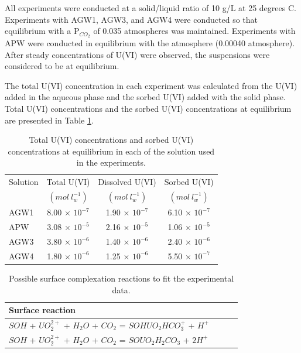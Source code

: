 All experiments were conducted at a solid/liquid ratio of 10 g/L at 
25 degrees C. Experiments with AGW1, AGW3, and AGW4 were conducted 
so that equilibrium with a P$_{CO_2}$ of 0.035 atmospheres was maintained.  
Experiments with APW were conducted in equilibrium with the 
atmosphere (0.00040 atmosphere).  
After steady concentrations of U(VI) were observed, 
the suspensions were considered to be at equilibrium.

The total U(VI) concentration in each experiment was calculated from the U(VI) 
added in the aqueous phase and the sorbed U(VI) added with the solid phase.  
Total U(VI) concentrations and the sorbed U(VI) concentrations 
at equilibrium are presented in Table \ref{ex_u_scm2}.

\begin{table}[h]
\caption{Total U(VI) concentrations and sorbed U(VI) concentrations 
at equilibrium in each of the solution used in the experiments.}
\begin{center}
\begin{tabular}{l c c c}
\hline
 Solution                & Total U(VI)              & Dissolved U(VI)         & Sorbed U(VI)        \\
                         & $(mol\ l^{-1}_w)$        & $(mol\ l^{-1}_w)$       & $(mol\ l^{-1}_w)$   \\ \hline
 AGW1                    & 8.00 $\times$ $10^{-7}$  & 1.90 $\times$ $10^{-7}$ & 6.10 $\times$ $10^{-7}$ \\
 APW                     & 3.08 $\times$ $10^{-5}$  & 2.16 $\times$ $10^{-5}$ & 1.06 $\times$ $10^{-5}$ \\ 
 AGW3                    & 3.80 $\times$ $10^{-6}$  & 1.40 $\times$ $10^{-6}$ & 2.40 $\times$ $10^{-6}$ \\
 AGW4                    & 1.80 $\times$ $10^{-6}$  & 1.25 $\times$ $10^{-6}$ & 5.50 $\times$ $10^{-7}$ \\ \hline
\end{tabular}
\label{ex_u_scm2}
\end{center}
\end{table}

\begin{table}[h]
\caption{Possible surface complexation reactions to fit the experimental data.}
\begin{center}
\begin{tabular}{l c c c}
\hline
 Surface reaction           \\ \hline
 $SOH$ + $UO_2^{2+}$ + $H_2O$ + $CO_2$ = $SOHUO_2HCO_3^+$ + $H^+$  \\
 $SOH$ + $UO_2^{2+}$ + $H_2O$ + $CO_2$ = $SOUO_2H_2CO_3$ + $2H^+$ \\ \hline
\end{tabular}
\label{ex_u_scm3}
\end{center}
\end{table}

